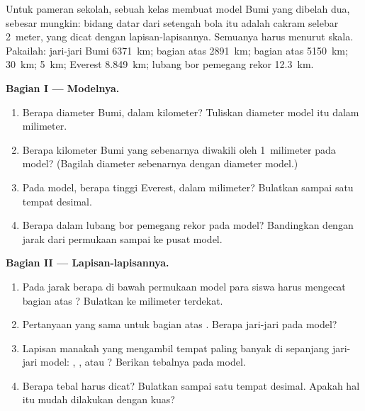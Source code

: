 \begin{problem}
\label{pb:g6:inside-the-earth:1}
Untuk pameran sekolah, sebuah kelas membuat model Bumi yang dibelah dua,
sebesar mungkin: bidang datar dari setengah bola itu adalah cakram selebar
2~meter, yang dicat dengan lapisan-lapisannya. Semuanya harus menurut skala.
Pakailah: jari-jari Bumi 6371~km; bagian atas  2891~km; bagian atas
 5150~km;   30~km;   5~km; Everest
8.849~km; lubang bor pemegang rekor 12.3~km.

\medskip
\noindent\textbf{Bagian I --- Modelnya.}
\begin{enumerate}
  \item Berapa diameter Bumi, dalam kilometer? Tuliskan diameter model itu
        dalam milimeter.
  \item Berapa kilometer Bumi yang sebenarnya diwakili oleh 1~milimeter pada
        model? (Bagilah diameter sebenarnya dengan diameter model.)
  \item Pada model, berapa tinggi Everest, dalam milimeter? Bulatkan sampai
        satu tempat desimal.
  \item Berapa dalam lubang bor pemegang rekor pada model? Bandingkan dengan
        jarak dari permukaan sampai ke pusat model.
\end{enumerate}

\medskip
\noindent\textbf{Bagian II --- Lapisan-lapisannya.}
\begin{enumerate}[resume]
  \item Pada jarak berapa di bawah permukaan model para siswa harus mengecat
        bagian atas ? Bulatkan ke milimeter terdekat.
  \item Pertanyaan yang sama untuk bagian atas . Berapa jari-jari
         pada model?
  \item Lapisan manakah yang mengambil tempat paling banyak di sepanjang
        jari-jari model: , , atau ? Berikan
        tebalnya pada model.
  \item Berapa tebal   harus dicat? Bulatkan sampai satu tempat desimal. Apakah hal itu mudah dilakukan dengan kuas?
\end{enumerate}


\end{problem}
